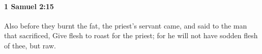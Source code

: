 
		\paragraph{1 Samuel 2:15} %
			\label{1SAMUEL-2-15}

			Also before they burnt the fat, the priest’s servant came, and said to the man that sacrificed, Give flesh to roast for the priest; for he will not have sodden flesh of thee, but raw.


